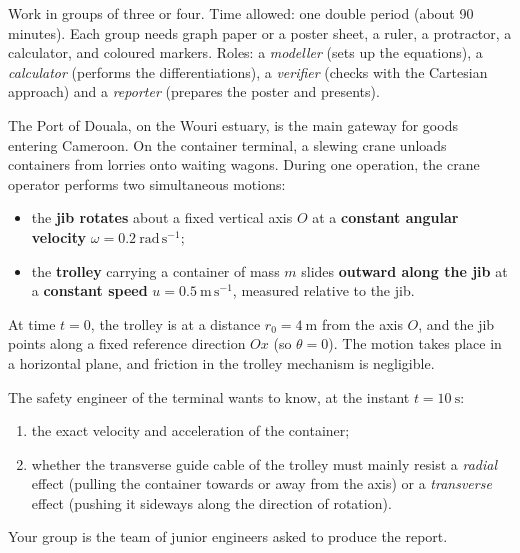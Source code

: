 \documentclass[11pt]{article}
\newcounter{popsec}
\newcounter{popsub}
\newcommand{\courssub}[1]{%
  \stepcounter{popsub}%
  \par\vspace{9pt}\noindent{\popxbold\fontsize{11.5}{13}\selectfont\color{popink}{\color{poporange}\thepopsec.\thepopsub}\hspace{6pt}#1}\par\nopagebreak\vspace{4pt}
}
\begin{document}
\begin{experience}[Organisation]
Work in groups of three or four. Time allowed: one double period (about 90 minutes). Each group needs graph paper or a poster sheet, a ruler, a protractor, a calculator, and coloured markers. Roles: a \emph{modeller} (sets up the equations), a \emph{calculator} (performs the differentiations), a \emph{verifier} (checks with the Cartesian approach) and a \emph{reporter} (prepares the poster and presents).
\end{experience}

\courssub{Situation}

\begin{exemplebox}
The Port of Douala, on the Wouri estuary, is the main gateway for goods entering Cameroon. On the container terminal, a slewing crane unloads containers from lorries onto waiting wagons. During one operation, the crane operator performs two simultaneous motions:

\begin{itemize}
\item the \textbf{jib rotates} about a fixed vertical axis $O$ at a \textbf{constant angular velocity} $\omega = 0.2\ \mathrm{rad\,s^{-1}}$;
\item the \textbf{trolley} carrying a container of mass $m$ slides \textbf{outward along the jib} at a \textbf{constant speed} $u = 0.5\ \mathrm{m\,s^{-1}}$, measured relative to the jib.
\end{itemize}

At time $t = 0$, the trolley is at a distance $r_0 = 4\ \mathrm{m}$ from the axis $O$, and the jib points along a fixed reference direction $Ox$ (so $\theta = 0$). The motion takes place in a horizontal plane, and friction in the trolley mechanism is negligible.

The safety engineer of the terminal wants to know, at the instant $t = 10\ \mathrm{s}$:

\begin{enumerate}
\item the exact velocity and acceleration of the container;
\item whether the transverse guide cable of the trolley must mainly resist a \emph{radial} effect (pulling the container towards or away from the axis) or a \emph{transverse} effect (pushing it sideways along the direction of rotation).
\end{enumerate}

Your group is the team of junior engineers asked to produce the report.
\end{exemplebox}
\end{document}
